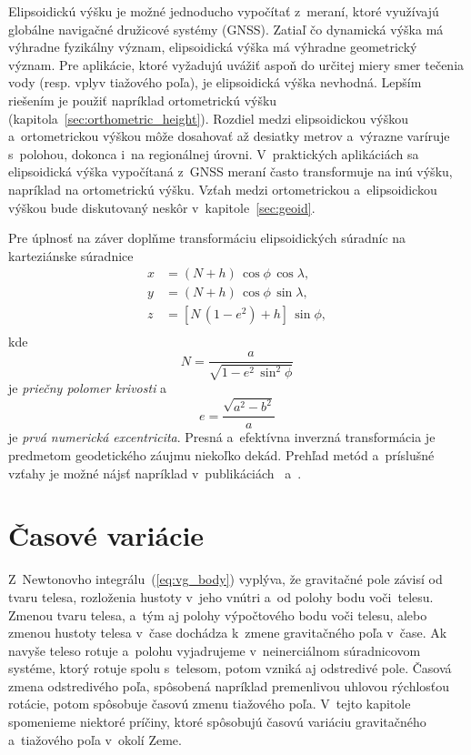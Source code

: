 \documentclass[a4paper, 12pt]{book}
\begin{document}
Elipsoidickú výšku je možné jednoducho vypočítať z~meraní, ktoré využívajú 
globálne navigačné družicové systémy (GNSS).  Zatiaľ čo dynamická výška má 
výhradne fyzikálny význam, elipsoidická výška má výhradne geometrický význam.  
Pre aplikácie, ktoré vyžadujú uvážiť aspoň do určitej miery smer tečenia vody 
(resp. vplyv tiažového poľa), je elipsoidická výška nevhodná.  Lepším riešením 
je použiť napríklad ortometrickú výšku (kapitola~\ref{sec:orthometric_height}).  
Rozdiel medzi elipsoidickou výškou a~ortometrickou výškou môže dosahovať až 
desiatky metrov a~výrazne varíruje s~polohou, dokonca i~na regionálnej úrovni.  
V~praktických aplikáciách sa elipsoidická výška vypočítaná z~GNSS meraní často 
transformuje na inú výšku, napríklad na ortometrickú výšku.  Vzťah medzi 
ortometrickou a~elipsoidickou výškou bude diskutovaný neskôr 
v~kapitole~\ref{sec:geoid}.

Pre úplnosť na záver doplňme transformáciu elipsoidických súradníc na 
karteziánske súradnice \parencite{MoritzPhysicalGeodesy}
%
\begin{equation}
\begin{split}
x &= (N + h) \, \cos\phi \, \cos\lambda{,}\\
y &= (N + h) \, \cos\phi \, \sin\lambda{,}\\
z &= \left[ N \, (1 - e^2) + h \right] \, \sin\phi{,}\\
\end{split}
\end{equation}
%
kde
%
\begin{equation}
\label{eq:curvature_N}
N = \frac{a}{\sqrt{1 - e^2 \, \sin^2\phi}}
\end{equation}
%
je \emph{priečny polomer krivosti} a
%
\begin{equation}
\label{eq:1st_eccentricity}
e = \frac{\sqrt{a^2 - b^2}}{a}
\end{equation}
%
je \emph{prvá numerická excentricita}.  Presná a~efektívna inverzná 
transformácia je predmetom geodetického záujmu niekoľko dekád.  Prehľad metód 
a~príslušné vzťahy je možné nájsť napríklad 
v~publikáciách~\textcite{Fukushima2006} a~\textcite{Claessens2019}.



\section{Časové variácie}
\label{sec:time_variable_gravity}

Z~Newtonovho integrálu~(\ref{eq:vg_body}) vyplýva, že gravitačné pole závisí od 
tvaru telesa, rozloženia hustoty v~jeho vnútri a~od polohy bodu voči~telesu.  
Zmenou tvaru telesa, a~tým aj polohy výpočtového bodu voči telesu, alebo zmenou 
hustoty telesa v~čase dochádza k~zmene gravitačného poľa v~čase.  Ak navyše 
teleso rotuje a~polohu vyjadrujeme v~neinerciálnom súradnicovom systéme, ktorý 
rotuje spolu s~telesom, potom vzniká aj odstredivé pole.  Časová zmena 
odstredivého poľa, spôsobená napríklad premenlivou uhlovou rýchlosťou rotácie, 
potom spôsobuje časovú zmenu tiažového poľa.  V~tejto kapitole spomenieme 
niektoré príčiny, ktoré spôsobujú časovú variáciu gravitačného a~tiažového poľa 
v~okolí Zeme.
\end{document}

